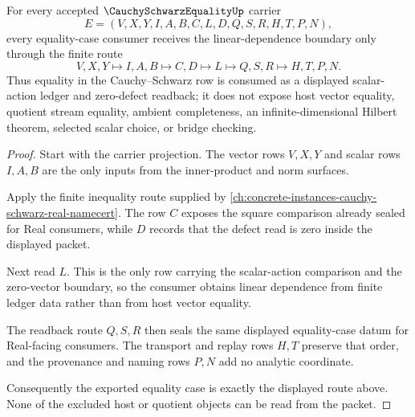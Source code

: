 
\begin{theorem}
\label{thm:cauchy-schwarz-equality-linear-dependence-route}
For every accepted $\CauchySchwarzEqualityUp$ carrier
$$
E=(V,X,Y,I,A,B,C,L,D,Q,S,R,H,T,P,N),
$$
every equality-case consumer receives the linear-dependence boundary only through the finite route
$$
V,X,Y \longmapsto I,A,B \longmapsto C,D \longmapsto L \longmapsto Q,S,R \longmapsto H,T,P,N .
$$
Thus equality in the Cauchy--Schwarz row is consumed as a displayed scalar-action ledger and zero-defect readback; it does not expose host vector equality, quotient stream equality, ambient completeness, an infinite-dimensional Hilbert theorem, selected scalar choice, or bridge checking.
\end{theorem}
\begin{proof}
Start with the carrier projection. The vector rows $V,X,Y$ and scalar rows $I,A,B$ are the only inputs from the inner-product and norm surfaces.

Apply the finite inequality route supplied by \autoref{ch:concrete-instances-cauchy-schwarz-real-namecert}. The row $C$ exposes the square comparison already sealed for Real consumers, while $D$ records that the defect read is zero inside the displayed packet.

Next read $L$. This is the only row carrying the scalar-action comparison and the zero-vector boundary, so the consumer obtains linear dependence from finite ledger data rather than from host vector equality.

The readback route $Q,S,R$ then seals the same displayed equality-case datum for Real-facing consumers. The transport and replay rows $H,T$ preserve that order, and the provenance and naming rows $P,N$ add no analytic coordinate.

Consequently the exported equality case is exactly the displayed route above. None of the excluded host or quotient objects can be read from the packet.
\end{proof}


